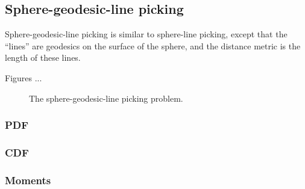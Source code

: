 \subsection{Sphere-geodesic-line picking}
\label{sec:sphere_geodesic_line}


Sphere-geodesic-line picking is similar to sphere-line picking, except
that the ``lines'' are geodesics on the surface of the sphere, and the
distance metric is the length of these lines.

Figures ...

\begin{figure}[tbp]
  \begin{center}
    \hspace{6mm}
    \caption{The sphere-geodesic-line picking problem.}
  \end{center} 
\vspace{-4mm}
\end{figure}

\subsubsection{PDF}


\subsubsection{CDF}


\subsubsection{Moments}



